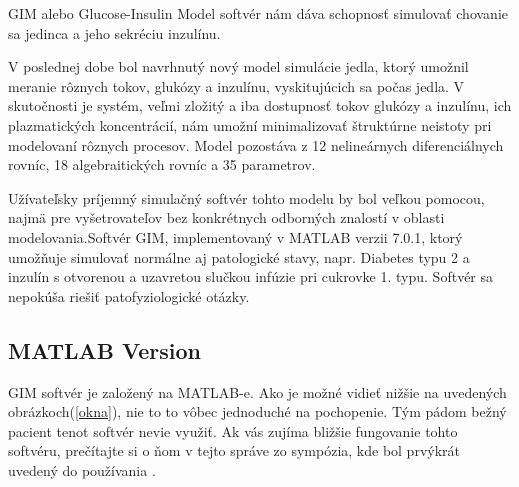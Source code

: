 
GIM alebo Glucose-Insulin Model softvér nám dáva schopnosť simulovať chovanie sa jedinca a jeho sekréciu inzulínu.\cite{2007}

V poslednej dobe bol navrhnutý nový model simulácie jedla, ktorý umožnil meranie rôznych tokov, glukózy a inzulínu, vyskitujúcich sa počas jedla. V skutočnosti je systém, veľmi zložitý a iba dostupnosť tokov glukózy a inzulínu, ich plazmatických koncentrácií, nám umožní minimalizovať štruktúrne neistoty pri modelovaní rôznych procesov. Model pozostáva z 12 nelineárnych diferenciálnych rovníc, 18 algebraitických rovníc a 35 parametrov.\cite{2007}

Užívateľsky príjemný simulačný softvér tohto modelu by bol veľkou pomocou, najmä pre vyšetrovateľov bez konkrétnych odborných znalostí v oblasti modelovania.Softvér GIM, implementovaný v MATLAB verzii 7.0.1, ktorý umožňuje simulovať normálne aj patologické stavy, napr. Diabetes typu 2 a inzulín s otvorenou a uzavretou slučkou infúzie pri cukrovke 1. typu. Softvér sa nepokúša riešiť patofyziologické otázky.\cite{2007}

\subsection{MATLAB Version}

GIM softvér je založený na MATLAB-e. Ako je možné vidieť nižšie na uvedených obrázkoch(\ref{okna}), nie to to vôbec jednoduché na pochopenie. Tým pádom bežný pacient tenot softvér nevie využiť. Ak vás zujíma bližšie fungovanie tohto softvéru, prečítajte si o ňom v tejto správe zo sympózia, kde bol prvýkrát uvedený do používania \cite{2007}.


